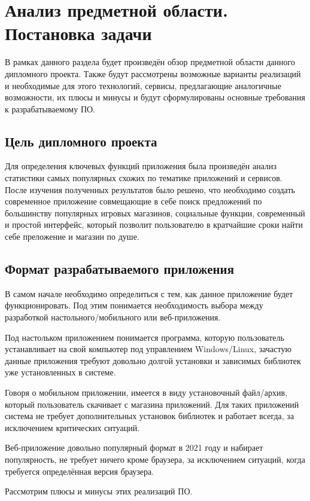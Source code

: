 \section{Анализ предметной области. Постановка задачи}
\label{sec:domain}
 
В рамках данного раздела будет произведён обзор предметной области данного дипломного проекта.
Также будут рассмотрены возможные варианты реализаций и необходимые для этого технологий, сервисы, предлагающие аналогичные возможности, их плюсы и минусы и будут сформулированы основные требования к разрабатываемому ПО.
 
\subsection{Цель дипломного проекта}
Для определения ключевых функций приложения была произведён анализ статистики самых популярных схожих по тематике приложений и сервисов. После изучения полученных результатов было решено, что необходимо создать современное приложение совмещающие в себе поиск предложений по большинству популярных игровых магазинов, социальные функции, современный и простой интерфейс, который позволит пользователю в кратчайшие сроки найти себе преложение и магазин по душе.

\subsection{Формат разрабатываемого приложения}
В самом начале необходимо определиться с тем, как данное приложение будет функционировать. Под этим понимается необходимость выбора между разработкой настольного/мобильного или веб-приложения.
 
Под настольком приложением понимается программа, которую пользователь устанавливает на свой компьютер под управлением Windows/Linux, зачастую данные приложения требуют довольно долгой установки и зависимых библиотек уже установленных в системе.

Говоря о мобильном приложении, имеется в виду установочный файл/архив, который пользователь скачивает с магазина приложений. Для таких приложений система не требует дополнительных установок библиотек и работает всегда, за исключением критических ситуаций.

Веб-приложение довольно популярный формат в 2021 году и набирает популярность, не требует ничего кроме браузера, за исключением ситуаций, когда требуется определённая версия браузера.

Рассмотрим плюсы и минусы этих реализаций ПО.

